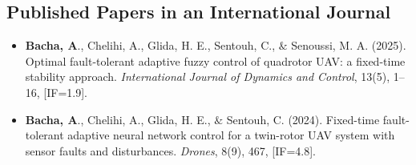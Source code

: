 \subsection*{Published Papers in an International Journal}
\begin{itemize}
    \item[1.] \textbf{Bacha, A}., Chelihi, A., Glida, H. E., Sentouh, C., $\&$ Senoussi, M. A. (2025). Optimal fault-tolerant adaptive fuzzy control of quadrotor UAV: a fixed-time stability approach. \textit{International Journal of Dynamics and Control}, 13(5), 1--16, [IF=1.9].
    \item[2.] \textbf{Bacha, A}., Chelihi, A., Glida, H. E., $\&$ Sentouh, C. (2024). Fixed-time fault-tolerant adaptive neural network control for a twin-rotor UAV system with sensor faults and disturbances. \textit{Drones}, 8(9), 467, [IF=4.8].
    
    
    \end{itemize}
